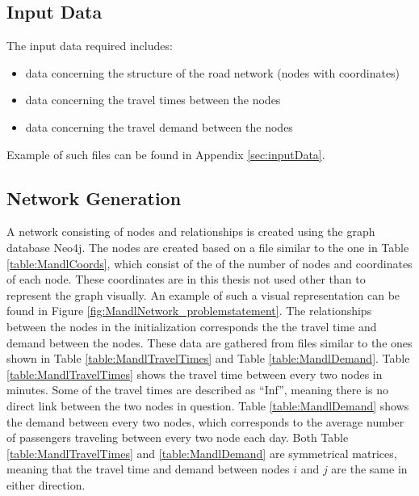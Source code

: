 \subsection{Input Data}
The input data required includes:
\begin{itemize}
\item data concerning the structure of the road network (nodes with coordinates)
\item data concerning the travel times between the nodes
\item data concerning the travel demand between the nodes
\end{itemize}
Example of such files can be found in Appendix \vref{sec:inputData}.

\subsection{Network Generation}
\label{subsec:networkGeneration}

A network consisting of nodes and relationships is created using the graph database Neo4j. The nodes are created based on a file similar to the one in Table \vref{table:MandlCoords}, which consist of the of the number of nodes and coordinates of each node. These coordinates are in this thesis not used other than to represent the graph visually. An example of such a visual representation can be found in Figure \vref{fig:MandlNetwork_problemstatement}. The relationships between the nodes in the initialization corresponds the the travel time and demand between the nodes. These data are gathered from files similar to the ones shown in Table 
\vref{table:MandlTravelTimes} and Table \vref{table:MandlDemand}. Table \ref{table:MandlTravelTimes} shows the travel time between every two nodes in minutes. Some of the travel times are described as ``Inf'', meaning there is no direct link between the two nodes in question. Table \ref{table:MandlDemand} shows the demand between every two nodes, which corresponds to the average number of passengers traveling between every two node each day. Both Table \ref{table:MandlTravelTimes} and \ref{table:MandlDemand} are symmetrical matrices, meaning that the travel time and demand between nodes $i$ and $j$ are the same in either direction. 


